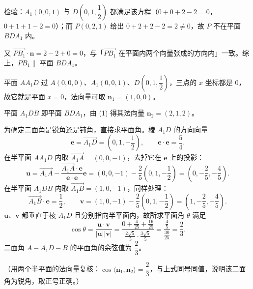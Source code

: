 \begin{answer}
检验：$A_1(0,0,1)$ 与 $D\left(0,1,\dfrac12\right)$ 都满足该方程（$0+0+2-2=0$，$0+1+1-2=0$）；而 $P(0,2,1)$ 给出 $0+2+2-2=2\neq0$，故 $P$ 不在平面 $BDA_1$ 内。

又 $\overrightarrow{PB_1}\cdot\boldsymbol n=2-2+0=0$，与「$\overrightarrow{PB_1}$ 在平面内两个向量张成的方向内」一致。综上，$PB_1\parallel$ 平面 $BDA_1$。


平面 $AA_1D$ 过 $A(0,0,0)$、$A_1(0,0,1)$、$D\left(0,1,\dfrac12\right)$，三点的 $x$ 坐标都是 $0$，故它就是平面 $x=0$，法向量可取 $\boldsymbol n_1=(1,0,0)$。

平面 $A_1DB$ 即平面 $BDA_1$，由 (1) 得其法向量 $\boldsymbol n_2=(2,1,2)$。

为确定二面角是锐角还是钝角，直接求平面角。棱 $A_1D$ 的方向向量
\nopagebreak[4]
\[
\boldsymbol e=\overrightarrow{A_1D}=\left(0,1,-\frac12\right),\qquad \boldsymbol e\cdot\boldsymbol e=\frac54.
\]
在半平面 $AA_1D$ 内取 $\overrightarrow{A_1A}=(0,0,-1)$，去掉它在 $\boldsymbol e$ 上的投影：
\nopagebreak[4]
\[
\boldsymbol u=\overrightarrow{A_1A}-\frac{\overrightarrow{A_1A}\cdot\boldsymbol e}{\boldsymbol e\cdot\boldsymbol e}\boldsymbol e
=(0,0,-1)-\frac{2}{5}\left(0,1,-\frac12\right)=\left(0,-\frac25,-\frac45\right).
\]
在半平面 $A_1DB$ 内取 $\overrightarrow{A_1B}=(1,0,-1)$，同样处理：
\nopagebreak[4]
\[
\overrightarrow{A_1B}\cdot\boldsymbol e=\frac12,\qquad
\boldsymbol v=(1,0,-1)-\frac25\left(0,1,-\frac12\right)=\left(1,-\frac25,-\frac45\right).
\]
$\boldsymbol u$、$\boldsymbol v$ 都垂直于棱 $A_1D$ 且分别指向半平面内，故所求平面角 $\theta$ 满足
\nopagebreak[4]
\[
\cos\theta=\frac{\boldsymbol u\cdot\boldsymbol v}{|\boldsymbol u||\boldsymbol v|}
=\frac{0+\frac4{25}+\frac{16}{25}}{\frac{2\sqrt5}{5}\cdot\frac{3\sqrt5}{5}}
=\frac{\frac45}{\frac{30}{25}}=\frac23.
\]
二面角 $A-A_1D-B$ 的平面角的余弦值为 $\dfrac23$。

（用两个半平面的法向量复核：$\cos\langle\boldsymbol n_1,\boldsymbol n_2\rangle=\dfrac{2}{3}$，与上式同号同值，说明该二面角为锐角，取正号正确。）



\end{answer}

